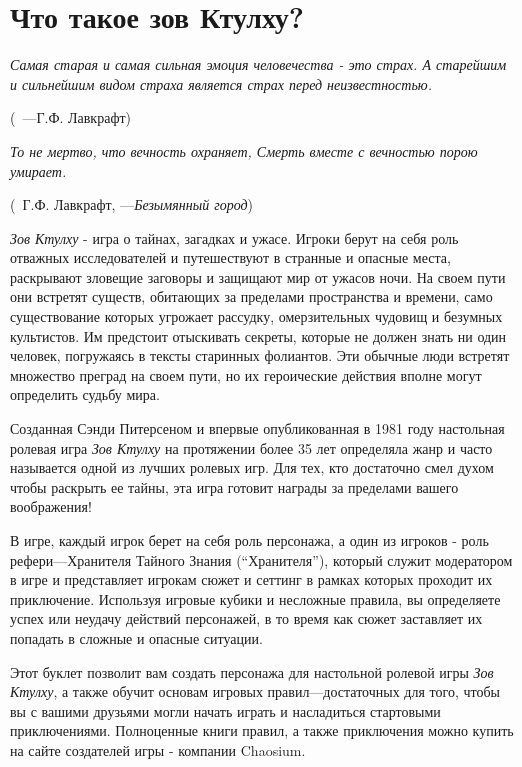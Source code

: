 \documentclass[letterpaper,twocolumn,openany, twoside, 11pt, usenames]{cocbook}
\renewenvironment{quote}{%
   \list{}{%
     \leftmargin0.0cm   %
     \rightmargin\leftmargin
   }
   \item\relax
}
{\endlist}
\let\oldquote\quote
\let\endoldquote\endquote
\renewenvironment{quote}[2][]
  {\if\relax\detokenize{#1}\relax
     \def\quoteauthor{~#2}%
   \fi
   \oldquote}
  {\par\nobreak\smallskip\hfill(\quoteauthor)%
   \endoldquote\addvspace{\bigskipamount}}
\begin{document}
\scriptsize

\section*{\nohyphens{Что такое зов Ктулху?}}
\begin{quote}{---Г.Ф. Лавкрафт}
{\it Самая старая и самая сильная эмоция человечества - это страх. А старейшим и сильнейшим видом страха является страх перед неизвестностью.}
\end{quote}

\begin{quote}{Г.Ф. Лавкрафт, ---{\it Безымянный город}}
{\it То не мертво, что вечность охраняет, Смерть вместе с вечностью порою умирает.}
\end{quote}

{\it Зов Ктулху} - игра о тайнах, загадках и ужасе. Игроки берут на себя роль отважных исследователей и путешествуют в странные и опасные места, раскрывают зловещие заговоры и защищают мир от ужасов ночи. На своем пути они встретят существ, обитающих за пределами пространства и времени, само существование которых угрожает рассудку, омерзительных чудовищ и безумных культистов. Им предстоит отыскивать секреты, которые не должен знать ни один человек, погружаясь в тексты старинных фолиантов. Эти обычные люди встретят множество преград на своем пути, но их героические действия вполне могут определить судьбу мира.

Созданная Сэнди Питерсеном и впервые опубликованная в 1981 году настольная ролевая игра {\it Зов Ктулху} на протяжении более 35 лет определяла жанр и часто называется одной из лучших ролевых игр. Для тех, кто достаточно смел духом чтобы раскрыть ее тайны, эта игра готовит награды за пределами вашего воображения!

В игре, каждый игрок берет на себя роль персонажа, а один из игроков - роль рефери---Хранителя Тайного Знания (``Хранителя''), который служит модератором в игре и представляет игрокам сюжет и сеттинг в рамках которых проходит их приключение. Используя игровые кубики и несложные правила, вы определяете успех или неудачу действий персонажей, в то время как сюжет заставляет их попадать в сложные и опасные ситуации.

Этот буклет позволит вам создать персонажа для настольной ролевой игры {\it Зов Ктулху}, а также обучит основам игровых правил---достаточных для того, чтобы вы с вашими друзьями могли начать играть и насладиться стартовыми приключениями. Полноценные книги правил, а также приключения можно купить на сайте создателей игры - компании Chaosium.
\end{document}
